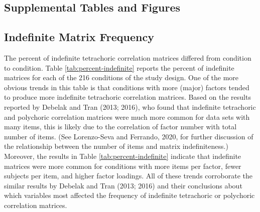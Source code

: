 \documentclass[
  english,
  man]{apa6}
\begin{document}
\clearpage
\makeatletter
\efloat@restorefloats
\makeatother


\begin{appendix}
\hypertarget{supplemental-tables-and-figures}{%
\section{Supplemental Tables and
Figures}\label{supplemental-tables-and-figures}}

\hypertarget{indefinite-matrix-frequency}{%
\subsection{Indefinite Matrix
Frequency}\label{indefinite-matrix-frequency}}

The percent of indefinite tetrachoric correlation matrices differed from
condition to condition. Table \ref{tab:percent-indefinite} reports the
percent of indefinite matrices for each of the 216 conditions of the
study design. One of the more obvious trends in this table is that
conditions with more (major) factors tended to produce more indefinite
tetrachoric correlation matrices. Based on the results reported by
Debelak and Tran (2013; 2016), who found that indefinite tetrachoric and
polychoric correlation matrices were much more common for data sets with
many items, this is likely due to the correlation of factor number with
total number of items. (See Lorenzo-Seva and Ferrando, 2020, for further
discussion of the relationship between the number of items and matrix
indefiniteness.) Moreover, the results in Table
\ref{tab:percent-indefinite} indicate that indefinite matrices were more
common for conditions with more items per factor, fewer subjects per
item, and higher factor loadings. All of these trends corroborate the
similar results by Debelak and Tran (2013; 2016) and their conclusions
about which variables most affected the frequency of indefinite
tetrachoric or polychoric correlation matrices.

\pagebreak


\end{appendix}
\end{document}
